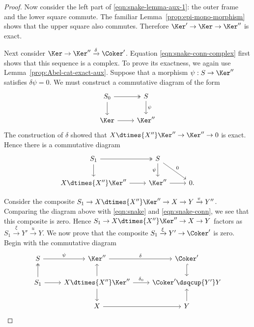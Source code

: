 \begin{proof}
	Now consider the left part of \eqref{eqn:snake-lemma-aux-1}: the outer
	frame and the lower square commute. The familiar
	Lemma~\ref{prop:epi-mono-morphism} shows that the upper square also
	commutes. Therefore $\Ker'\to\Ker\to\Ker''$ is exact.
	
	Next consider $\Ker\to\Ker''\xrightarrow{\delta}\Coker'$. Equation
	\eqref{eqn:snake-conn-complex} first shows that this sequence is a complex.
	To prove its exactness, we again use Lemma~\ref{prop:Abel-cat-exact-aux}.
	Suppose that a morphism $\psi:S\to\Ker''$ satisfies $\delta\psi=0$. We
	must construct a commutative diagram of the form
	\begin{equation}\label{eqn:snake-lemma-aux-2}
	\begin{tikzcd}
		S_0 \arrow[d] \arrow[twoheadrightarrow, r] & S \arrow[d, "\psi"] \\
		\Ker \arrow[r] & \Ker''
	\end{tikzcd}\end{equation}
	The construction of $\delta$ showed that
	$X\dtimes{X''}\Ker''\to\Ker''\to0$ is exact. Hence there is a commutative
	diagram
	\begin{equation}\label{eqn:snake-lemma-aux-3}
	\begin{tikzcd}
		S_1 \arrow[twoheadrightarrow, r] \arrow[d] & S \arrow[d, "\psi"'] \arrow[rd, "0"] & \\
		X \dtimes{X''} \Ker'' \arrow[r] & \Ker'' \arrow[r] & 0 .
	\end{tikzcd}\end{equation}

	Consider the composite
	$S_1\to X\dtimes{X''}\Ker''\to X\to Y\xrightarrow{v}Y''$. Comparing the
	diagram above with \eqref{eqn:snake} and \eqref{eqn:snake-conn}, we see that
	this composite is zero. Hence $S_1\to X\dtimes{X''}\Ker''\to X\to Y$
	factors as $S_1\xrightarrow{\xi}Y'\xrightarrow{u}Y$. We now prove that the
	composite $S_1\xrightarrow{\xi}Y'\to\Coker'$ is zero. Begin with the
	commutative diagram
	\[\begin{tikzcd}
		S \arrow[r, "\psi"] & \Ker'' \arrow[r, "\delta"] & \Coker' \arrow[hookrightarrow, d] \\
		S_1 \arrow[twoheadrightarrow, u] \arrow[r] & X \dtimes{X''} \Ker'' \arrow[r, "\delta_0"] \arrow[u] \arrow[d] & \Coker' \dsqcup{Y'} Y \\
		& X \arrow[r] & Y \arrow[u]
	\end{tikzcd}\]


\end{proof}
